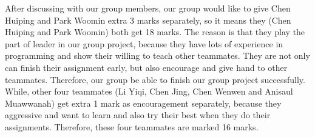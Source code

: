 \documentclass[a4paper,11pt]{article}
\begin{document}
After discussing with our group members, our group would like to give Chen Huiping and Park Woomin extra 3 marks separately, so it means they (Chen Huiping and Park Woomin) both get 18 marks. The reason is that they play the part of leader in our group project, because they have lots of experience in programming and show their willing to teach other teammates. They are not only can finish their assignment early, but also encourage and give hand to other teammates. Therefore, our group be able to finish our group project successfully. While, other four teammates (Li Yiqi, Chen Jing, Chen Wenwen and Anisaul Muawwanah) get extra 1 mark as encouragement separately, because they aggressive and want to learn and also try their best when they do their assignments. Therefore, these four teammates are marked 16 marks.
\end{document}
